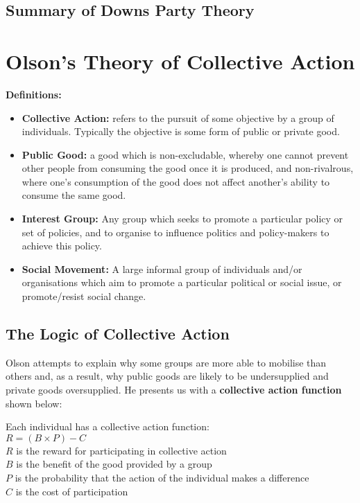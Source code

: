 \documentclass[12pt, letterpaper]{article}
\begin{document}
\subsection{Summary of Downs Party Theory}

\newpage
\section{Olson's Theory of Collective Action}
\textbf{Definitions:} 
\begin{itemize}	
	\item \textbf{Collective Action:} refers to the pursuit of some objective by a group of individuals. Typically the objective is some form of public or private good.
	\item \textbf{Public Good:} a good which is non-excludable, whereby one cannot prevent other people from consuming the good once it is produced, and non-rivalrous, where one's consumption of the good does not affect another's ability to consume the same good.
	\item \textbf{Interest Group:} Any group which seeks to promote a particular policy or set of policies, and to organise to influence politics and policy-makers to achieve this policy.
	\item \textbf{Social Movement:} A large informal group of individuals and/or organisations which aim to promote a particular political or social issue, or promote/resist social change.

\end{itemize}

\subsection{The Logic of Collective Action}
Olson attempts to explain why some groups are more able to mobilise than others and, as a result, why public goods are likely to be undersupplied and private goods oversupplied. He presents us with a \textbf{collective action function} shown below:

\begin{center}
Each individual has a collective action function: \\
$R=(B \times P) - C$ \\
$R$ is the reward for participating in collective action \\
$B$ is the benefit of the good provided by a group \\
$P$ is the probability that the action of the individual makes a difference \\
$C$ is the cost of participation
\end{center}
\end{document}
